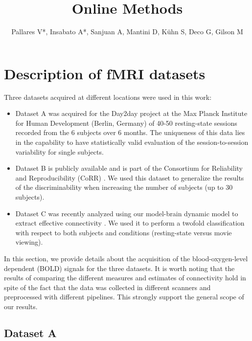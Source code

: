\documentclass{article}
\begin{document}
\title{Online Methods}

\author{Pallares V*, Insabato A*, Sanjuan A, Mantini D, K{\"u}hn S, Deco G, Gilson M}

\maketitle



\section{Description of fMRI datasets}

Three datasets acquired at different locations were used in this work:
\begin{itemize}
\item
Dataset A was acquired for the Day2day project \cite{Filevich_BMC_2017} at the Max Planck Institute for Human Development (Berlin, Germany) of 40-50 resting-state sessions recorded from the 6 subjects over 6 months. The uniqueness of this data lies in the capability to have statistically valid evaluation of the session-to-session variability for single subjects.
\item
Dataset B is publicly available and is part of the Consortium for Reliability and Reproducibility (CoRR) \cite{Zuo_SciData_2014}. We used this dataset to generalize the results of the discriminability when increasing the number of subjects (up to 30 subjects).
\item
Dataset C \cite{Mantini_NatM_2012} was recently analyzed using our model-brain dynamic model to extract effective connectivity \cite{Gilson_NeIm_2017}. We used it to perform a twofold classification with respect to both subjects and conditions (resting-state versus movie viewing). 
\end{itemize}
In this section, we provide details about the acquisition of the blood-oxygen-level dependent (BOLD) signals for the three datasets. It is worth noting that the results of comparing the different measures and estimates of connectivity hold in spite of the fact that the data was collected in different scanners and preprocessed with different pipelines. This strongly support the general scope of our results. 

\subsection{Dataset A}
\end{document}
